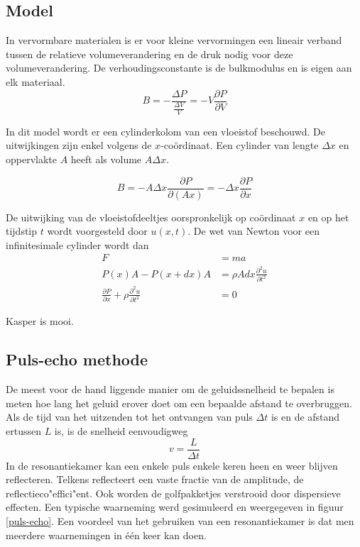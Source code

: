 \subsection{Model}

In vervormbare materialen is er voor kleine vervormingen een lineair verband 
tussen de relatieve volumeverandering en de druk nodig voor deze 
volumeverandering. De verhoudingsconstante is de bulkmodulus en is eigen aan 
elk materiaal.
\begin{equation}
\label{bulkmod}
B = -\frac{\Delta P}{\frac{\Delta V}{V}} = - V \frac{\partial P}{\partial V}
\end{equation}


In dit model wordt er een cylinderkolom van een vloeistof beschouwd. De 
uitwijkingen zijn enkel volgens de $x$-co\"ordinaat. Een cylinder van lengte 
$\Delta x$ en oppervlakte $A$ heeft als volume $A \Delta x$.

\begin{equation}
\label{bulkmod1d}
B = -A \Delta x \frac{\partial P}{\partial( A x)} = -\Delta x \frac{\partial 
P}{\partial x}
\end{equation}

De uitwijking van de vloeistofdeeltjes oorspronkelijk op co\"ordinaat $x$ en op 
het tijdstip $t$ wordt voorgesteld door $u(x,t)$. De wet van Newton voor een 
infinitesimale cylinder wordt dan
\begin{align*}
F &= ma \\
P(x)A - P(x+dx)A &= \rho A dx \frac{ \partial^2 u}{\partial t^2} \\
\frac{\partial P}{\partial x} + \rho \frac{ \partial^2 u}{\partial t^2} &= 0

\end{align*}

Kasper is mooi.


\subsection{Puls-echo methode}
De meest voor de hand liggende manier om de geluidssnelheid te bepalen is meten 
hoe lang het geluid erover doet om een bepaalde afstand te overbruggen. Als de 
tijd van het uitzenden tot het ontvangen van puls $\Delta t$ is en de afstand 
ertussen $L$ is, is de snelheid eenvoudigweg
$$
v = \frac{L}{\Delta t}
$$
In de resonantiekamer kan een enkele puls enkele keren heen en weer blijven 
reflecteren. Telkens reflecteert een vaste fractie van de amplitude, de 
reflectieco"effici"ent. Ook worden de golfpakketjes verstrooid door dispersieve 
effecten. Een typische waarneming werd gesimuleerd en weergegeven in figuur 
\ref{puls-echo}.  Een voordeel van het gebruiken van een resonantiekamer is dat
men meerdere waarnemingen in \'e\'en keer kan doen.

